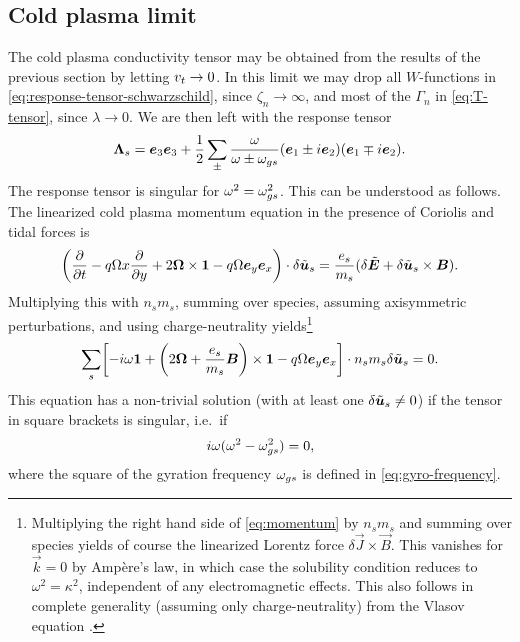 \documentclass[aps,pre,notitlepage,amsmath,amssymb,amsfonts,nobibnotes,nofootinbib,superscriptaddress]{revtex4-1}
\begin{document}
\subsection{Cold plasma limit}
\label{sec:cold}

The cold plasma conductivity tensor may be obtained from the results of the
previous section by letting $v_t\to0$. In this limit we may drop all
$W$-functions in \cref{eq:response-tensor-schwarzschild}, since
$\zeta_n\to\infty$, and most of the $\Gamma_n$ in \cref{eq:T-tensor}, since
$\lambda\to0$. We are then left with the response tensor
\begin{equation}
  \label{eq:cold-response}
  \mathbf{\Lambda}_s = \vec{e}_3\vec{e}_3
  + \frac{1}{2}\sum_\pm\frac{\omega}{\omega\pm\omgs}
  (\vec{e}_1\pm i\vec{e}_2)(\vec{e}_1\mp i\vec{e}_2).
\end{equation}
The response tensor is singular for $\omega^2=\omega_{gs}^2$. This can be understood
as follows. The linearized cold plasma momentum equation in the presence of
Coriolis and tidal forces is
\begin{equation}
  \label{eq:momentum}
  \left(
    \pder{}{t} - q\Omega x\pder{}{y}
    + 2\vec{\Omega}\times\mathbf{1} - q\Omega\ey\ex
  \right)\cdot\delta\tvec{u}_s =
  \frac{\qs}{m_s}(\delta\tvec{E} + \delta\tvec{u}_s\times\vec{B}).
\end{equation}
Multiplying this with $n_s{}m_s$, summing over species, assuming axisymmetric
perturbations, and using charge-neutrality yields\footnote{Multiplying the
  right hand side of \cref{eq:momentum} by $n_s{}m_s$ and summing over species
  yields of course the linearized Lorentz force $\delta\vec{J}\times\vec{B}$.
  This vanishes for $\vec{k}=0$ by Ampère's law, in which case the solubility
  condition reduces to $\omega^2=\kappa^2$, independent of any electromagnetic
  effects. This also follows in complete generality (assuming only
  charge-neutrality) from the Vlasov equation .}
\begin{equation}
  \label{eq:sum-cold-momentum}
  \sums\left[
    -i\omega\mathbf{1}
    + \left(2\vec{\Omega} + \frac{\qs}{m_s}\vec{B}\right)\times\mathbf{1}
    - q\Omega\ey\ex
  \right]\cdot n_s m_s\delta\tvec{u}_s = 0.
\end{equation}
This equation has a non-trivial solution (with at least one
$\delta\tilde{\bm{u}}_s\ne0$) if the tensor in square brackets is singular, i.e.\ if
\begin{equation}
  i\omega(\omega^2 - \omega_{gs}^2) = 0,
\end{equation}
where the square of the gyration frequency $\omega_{gs}$ is defined in
\cref{eq:gyro-frequency}.
\end{document}

